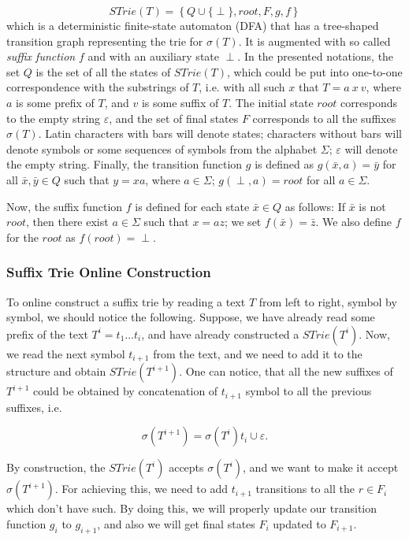 \documentclass[paper=a4, fontsize=11pt]{scrartcl} %
\numberwithin{equation}{section} %
\numberwithin{figure}{section} %
\numberwithin{table}{section} %
\begin{document}
\begin{equation}
STrie(T) = \left\{Q \cup \{\perp\}, root, F, g, f \right\}
\end{equation}
which is a deterministic finite-state automaton (DFA) that has a tree-shaped transition graph representing the trie for $\sigma(T)$. It is augmented with so called \textit{suffix function} $f$ and with an auxiliary state $\perp$. In the presented notations, the set $Q$ is the set of all the states of $STrie(T)$, which could be put into one-to-one correspondence with the substrings of $T$, i.e. with all such $x$ that $T = a\ x\ v$, where $a$ is some prefix of $T$, and $v$ is some suffix of $T$. The initial state $root$ corresponds to the empty string $\varepsilon$, and the set of final states $F$ corresponds to all the suffixes $\sigma(T)$. Latin characters with bars will denote states; characters without bars will denote symbols or some sequences of symbols from the alphabet $\Sigma$; $\varepsilon$ will denote the empty string. Finally, the transition function $g$ is defined as $g(\bar{x}, a) = \bar{y}$ for all $\bar{x}, \bar{y} \in Q$ such that $y = xa$, where $a \in \Sigma$; $g(\perp, a) = root$ for all $a \in \Sigma$.

\par Now, the suffix function $f$ is defined for each state $\bar{x} \in Q$ as follows: If $\bar{x}$ is not $root$, then there exist $a \in \Sigma$ such that $x = az$; we set $f(\bar{x}) = \bar{z}$. We also define $f$ for the $root$ as $f(root) = \perp$.

\subsubsection{Suffix Trie Online Construction}
\par To online construct a suffix trie by reading a text $T$ from left to right, symbol by symbol, we should notice the following. Suppose, we have already read some prefix of the text $T^i = t_1 \dots t_i$, and have already constructed a $STrie(T^i)$. Now, we read the next symbol $t_{i+1}$ from the text, and we need to add it to the structure and obtain $STrie(T^{i+1})$. One can notice, that all the new suffixes of $T^{i+1}$ could be obtained by concatenation of $t_{i+1}$ symbol to all the previous suffixes, i.e.

$$
\sigma(T^{i+1}) = \sigma(T^i)t_i \cup \varepsilon.
$$

\par By construction, the $STrie(T^i)$ accepts $\sigma(T^i)$, and we want to make it accept $\sigma(T^{i+1})$. For achieving this, we need to add $t_{i+1}$ transitions to all the $r \in F_i$ which don't have such. By doing this, we will properly update our transition function $g_i$ to $g_{i+1}$, and also we will get final states $F_i$ updated to $F_{i+1}$.
\end{document}
